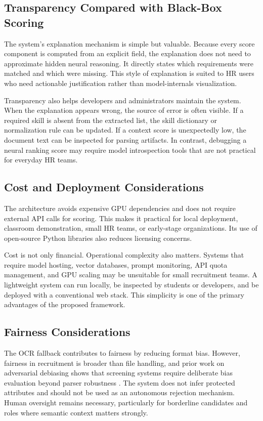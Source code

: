 \documentclass[conference]{IEEEtran}
\begin{document}
\subsection{Transparency Compared with Black-Box Scoring}
The system's explanation mechanism is simple but valuable. Because every score component is computed from an explicit field, the explanation does not need to approximate hidden neural reasoning. It directly states which requirements were matched and which were missing. This style of explanation is suited to HR users who need actionable justification rather than model-internals visualization.

Transparency also helps developers and administrators maintain the system. When the explanation appears wrong, the source of error is often visible. If a required skill is absent from the extracted list, the skill dictionary or normalization rule can be updated. If a context score is unexpectedly low, the document text can be inspected for parsing artifacts. In contrast, debugging a neural ranking score may require model introspection tools that are not practical for everyday HR teams.

\subsection{Cost and Deployment Considerations}
The architecture avoids expensive GPU dependencies and does not require external API calls for scoring. This makes it practical for local deployment, classroom demonstration, small HR teams, or early-stage organizations. Its use of open-source Python libraries also reduces licensing concerns.

Cost is not only financial. Operational complexity also matters. Systems that require model hosting, vector databases, prompt monitoring, API quota management, and GPU scaling may be unsuitable for small recruitment teams. A lightweight system can run locally, be inspected by students or developers, and be deployed with a conventional web stack. This simplicity is one of the primary advantages of the proposed framework.

\subsection{Fairness Considerations}
The OCR fallback contributes to fairness by reducing format bias. However, fairness in recruitment is broader than file handling, and prior work on adversarial debiasing shows that screening systems require deliberate bias evaluation beyond parser robustness \cite{b4}. The system does not infer protected attributes and should not be used as an autonomous rejection mechanism. Human oversight remains necessary, particularly for borderline candidates and roles where semantic context matters strongly.
\end{document}
